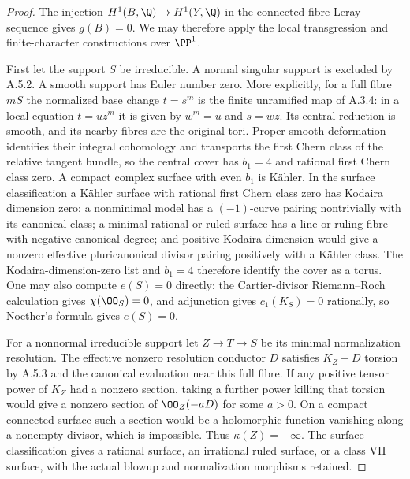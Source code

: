 \begin{proof}
The injection $H^1(B,\Q)\to H^1(Y,\Q)$ in the connected-fibre
Leray sequence gives $g(B)=0$. We may therefore apply the local
transgression and finite-character constructions over $\PP^1$.

First let the support $S$ be irreducible. A normal singular
support is excluded by A.5.2. A smooth support has Euler number
zero. More explicitly, for a full fibre $mS$ the normalized base
change $t=s^m$ is the finite unramified map of A.3.4: in a local
equation $t=uz^m$ it is given by $w^m=u$ and $s=wz$.
Its central reduction is smooth, and its nearby fibres are the
original tori. Proper smooth deformation identifies their
integral cohomology and transports the first Chern class of
the relative tangent bundle, so the central cover has $b_1=4$
and rational first Chern class zero. A compact complex surface
with even $b_1$ is K\"ahler. In the surface classification a
K\"ahler surface with rational first Chern class zero has
Kodaira dimension zero: a nonminimal model has a $(-1)$-curve
pairing nontrivially with its canonical class; a minimal
rational or ruled surface has a line or ruling fibre with
negative canonical degree; and positive Kodaira dimension
would give a nonzero
effective pluricanonical divisor pairing positively with a
K\"ahler class. The Kodaira-dimension-zero list and $b_1=4$
therefore identify the cover as a torus. One may also compute
$e(S)=0$ directly: the
Cartier-divisor Riemann--Roch calculation gives
$\chi(\OO_S)=0$, and adjunction gives $c_1(K_S)=0$ rationally,
so Noether's formula gives $e(S)=0$.

For a nonnormal irreducible support let $Z\to T\to S$ be its
minimal normalization resolution. The effective nonzero
resolution conductor $D$ satisfies $K_Z+D$ torsion by A.5.3
and the canonical evaluation near this full fibre. If any
positive tensor power of $K_Z$ had a nonzero section, taking
a further power killing that torsion would give a nonzero
section of $\OO_Z(-aD)$ for some $a>0$. On a compact connected
surface such a section would be a holomorphic function
vanishing along a nonempty divisor, which is impossible.
Thus $\kappa(Z)=-\infty$. The surface classification gives a
rational surface, an irrational ruled surface, or a class VII
surface, with the actual blowup and normalization morphisms
retained.


\end{proof}
